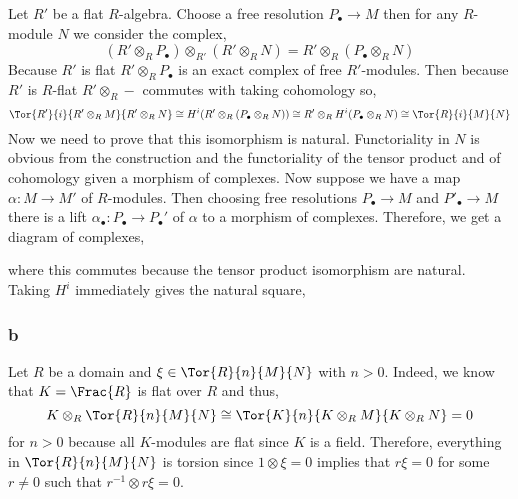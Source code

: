 \documentclass[12pt]{article}
\begin{document}
Let $R'$ be a flat $R$-algebra. Choose a free resolution $P_\bullet \to M$ then for any $R$-module $N$ we consider the complex,
\[ (R' \otimes_R P_\bullet) \otimes_{R'} (R' \otimes_R N) = R' \otimes_R (P_\bullet \otimes_R N) \]
Because $R'$ is flat $R' \otimes_R P_\bullet$ is an exact complex of free $R'$-modules. Then because $R'$ is $R$-flat $R' \otimes_R -$ commutes with taking cohomology so,
\[ \Tor{R'}{i}{R' \otimes_R M}{R' \otimes_R N} \cong H^i(R' \otimes_R (P_\bullet \otimes_R N)) \cong R' \otimes_R H^i(P_\bullet \otimes_R N) \cong \Tor{R}{i}{M}{N} \]
Now we need to prove that this isomorphism is natural. Functoriality in $N$ is obvious from the construction and the functoriality of the tensor product and of cohomology given a morphism of complexes. Now suppose we have a map $\alpha : M \to M'$ of $R$-modules. Then choosing free resolutions $P_\bullet \to M$ and $P'_\bullet \to M$ there is a lift $\alpha_\bullet : P_\bullet \to P_\bullet'$ of $\alpha$ to a morphism of complexes. Therefore, we get a diagram of complexes,
\begin{center}
\end{center}
where this commutes because the tensor product isomorphism are natural. Taking $H^i$ immediately gives the natural square,
\begin{center}
\end{center}

\subsubsection{b}

Let $R$ be a domain and $\xi \in \Tor{R}{n}{M}{N}$ with $n > 0$. Indeed, we know that $K = \Frac{R}$ is flat over $R$ and thus,
\[ K \otimes_R \Tor{R}{n}{M}{N} \cong \Tor{K}{n}{K \otimes_R M}{K \otimes_R N} = 0 \]
for $n > 0$ because all $K$-modules are flat since $K$ is a field. Therefore, everything in $\Tor{R}{n}{M}{N}$ is torsion since $1 \otimes \xi = 0$ implies that $r \xi = 0$ for some $r \neq 0$ such that $r^{-1} \otimes r \xi = 0$.
\end{document}
